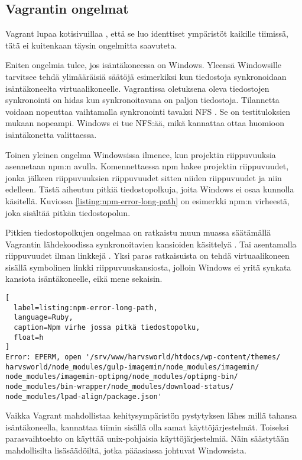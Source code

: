 \subsection{Vagrantin ongelmat}

Vagrant lupaa kotisivuillaa \cite{link:vagrant}, että se luo identtiset ympäristöt kaikille tiimissä, tätä ei kuitenkaan täysin ongelmitta saavuteta.

Eniten ongelmia tulee, jos isäntäkoneessa on Windows. Yleensä Windowsille tarvitsee tehdä ylimääräisiä säätöjä esimerkiksi kun tiedostoja synkronoidaan isäntäkoneelta virtuaalikoneelle. Vagrantissa oletuksena oleva tiedostojen synkronointi on hidas \cite{link:vagrant-shared-folders} kun synkronoitavana on paljon tiedostoja. Tilannetta voidaan nopeuttaa vaihtamalla synkronointi tavaksi NFS \cite{link:nfs-wiki}. Se on testituloksien mukaan nopeampi. Windows ei tue NFS:ää, mikä kannattaa ottaa huomioon isäntäkonetta valittaessa.

Toinen yleinen ongelma Windowsissa ilmenee, kun projektin riippuvuuksia asennetaan npm:n avulla. Komennettaessa  npm hakee projektin riippuvuudet, jonka jälkeen riippuvuuksien riippuvuudet sitten niiden riippuvuudet ja niin edelleen. Tästä aiheutuu pitkiä tiedostopolkuja, joita Windows ei osaa kunnolla käsitellä. Kuviossa \ref{listing:npm-error-long-path} on esimerkki npm:n virheestä, joka sisältää pitkän tiedostopolun.

Pitkien tiedostopolkujen ongelmaa on ratkaistu muun muassa säätämällä Vagrantin lähdekoodissa synkronoitavien kansioiden käsittelyä \cite{link:fix-npm-on-vagrant-on-windows}. Tai asentamalla riippuvuudet ilman linkkejä \cite{link:npm-does-not-work-in-vagrant}. Yksi paras ratkaisuista on tehdä virtuaalikoneen sisällä symbolinen linkki riippuvuuskansiosta, jolloin Windows ei yritä synkata kansiota isäntäkoneelle, eikä mene sekaisin.

\begin{lstlisting}[
  label=listing:npm-error-long-path,
  language=Ruby,
  caption=Npm virhe jossa pitkä tiedostopolku,
  float=h
]
Error: EPERM, open '/srv/www/harvsworld/htdocs/wp-content/themes/
harvsworld/node_modules/gulp-imagemin/node_modules/imagemin/
node_modules/imagemin-optipng/node_modules/optipng-bin/
node_modules/bin-wrapper/node_modules/download-status/
node_modules/lpad-align/package.json'
\end{lstlisting}

Vaikka Vagrant mahdollistaa kehitysympäristön pystytyksen lähes millä tahansa isäntäkoneella, kannattaa tiimin sisällä olla samat käyttöjärjestelmät. Toiseksi parasvaihtoehto on käyttää unix-pohjaisia käyttöjärjestelmiä. Näin säästytään mahdollisilta lisäsäädöiltä, jotka pääasiassa johtuvat Windowsista.